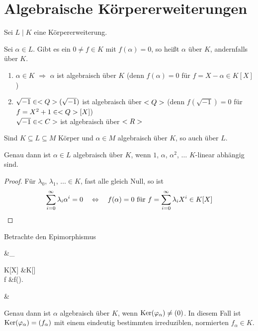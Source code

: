 \section{Algebraische Körpererweiterungen}

Sei $L \mid K$ eine Körpererweiterung.

\begin{definition}
	Sei $\alpha \in L$. Gibt es ein $0 \neq f \in K$ mit $f(\alpha) = 0$, so heißt $\alpha$  über $K$, andernfalls  über $K$.
\end{definition}

\begin{example}
	\begin{enumerate}[label=(\alph*)]
		\item $\alpha \in K$ $\Rightarrow$ $\alpha$ ist algebraisch über $K$ (denn $f(\alpha) = 0$ für $f = X - \alpha \in K[X]$)
		\item $\sqrt{-1} \in <Q>(\sqrt{-1})$ ist algebraisch über $<Q>$ (denn $f(\sqrt{-1})=0$ für $f = X^2 + 1 \in <Q>[X]$) \\
		$\sqrt{-1} \in <C>$ ist algebraisch über $<R>$        
	\end{enumerate}
\end{example}

\begin{remark}
	Sind $K \subseteq L \subseteq M$ Körper und $\alpha \in M$ algebraisch über $K$, so auch über $L$.
\end{remark}

\begin{lemma} 
	Genau dann ist $\alpha \in L$ algebraisch über $K$, wenn $1$, $\alpha$, $\alpha^2$, $\dots$ $K$-linear abhängig sind.
\end{lemma}

\begin{proof}
	Für $\lambda_0$, $\lambda_1$, $\ldots \in K$, fast alle gleich Null, so ist
	\begin{align}
	\sum_{i=0}^\infty \lambda_i \alpha^i = 0\quad \Leftrightarrow\quad f(\alpha) = 0 \text{ für } f = \sum_{i=0}^\infty \lambda_i X^i \in K[X]\notag
	\end{align}
\end{proof}

\begin{lemma}
	Betrachte den Epimorphismus \begin{flalign*}
	\qquad&\phi_{\alpha}\colon \begin{cases}
	K[X] &\to K[\alpha]\\
	f &\mapsto f(\alpha).
	\end{cases}&
	\end{flalign*}
	Genau dann ist $\alpha$ algebraisch über $K$, wenn $\operatorname{Ker}(\varphi_\alpha) \neq (0)$. In diesem Fall ist $\operatorname{Ker}(\varphi_\alpha) = (f_\alpha)$ mit einem eindeutig bestimmten irreduziblen, normierten $f_\alpha \in K$.
\end{lemma}

